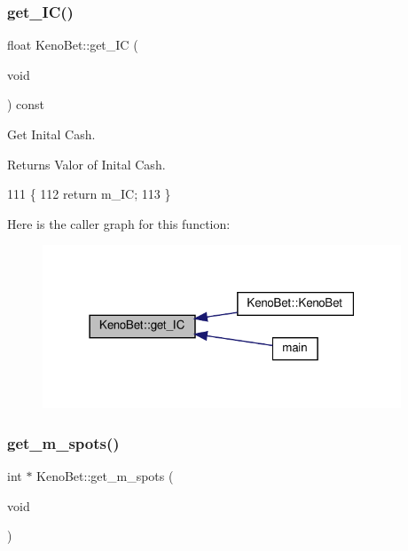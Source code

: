 \subsubsection{\texorpdfstring{get\+\_\+\+I\+C()}{get\_IC()}}
{\footnotesize\ttfamily float Keno\+Bet\+::get\+\_\+\+IC (\begin{DoxyParamCaption}\item[{void}]{ }\end{DoxyParamCaption}) const}



Get Inital Cash. 

\begin{DoxyReturn}{Returns}
Valor of Inital Cash. 
\end{DoxyReturn}

\begin{DoxyCode}
111 \{
112     \textcolor{keywordflow}{return} m\_IC;
113 \}
\end{DoxyCode}
Here is the caller graph for this function\+:
\nopagebreak
\begin{figure}[H]
\begin{center}
\leavevmode
\includegraphics[width=303pt]{classKenoBet_aace00d82c42c9870a4f3b95c7ec79f24_icgraph}
\end{center}
\end{figure}
\mbox{\label{classKenoBet_a386ab5f7108fd2df3518f37bfca2b2ef}} 
\subsubsection{\texorpdfstring{get\+\_\+m\+\_\+spots()}{get\_m\_spots()}}
{\footnotesize\ttfamily int $\ast$ Keno\+Bet\+::get\+\_\+m\+\_\+spots (\begin{DoxyParamCaption}\item[{void}]{ }\end{DoxyParamCaption})}



